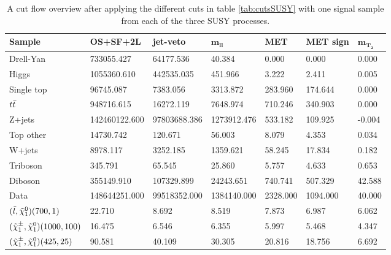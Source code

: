 \begin{landscape}
\begin{table}[H]
    \centering
    \begin{tabular}{l l l l l l l}
    \toprule
    \textbf{Sample} & \textbf{OS+SF+2L} & \textbf{jet-veto} & $\mathbf{m_{ll}}$ & \textbf{MET} & \textbf{MET sign} & $\mathbf{m_{T_2}}$\\
    \midrule
    \midrule
        Drell-Yan & 733055.427 & 64177.536 & 40.384 & 0.000 & 0.000  & 0.000 \\
        Higgs & 1055360.610 & 442535.035 & 451.966 & 3.222 & 2.411 & 0.005\\
        Single top & 96745.087 & 7383.056 & 3313.872 & 283.960 & 174.644 & 0.000\\
        $t\Bar{t}$ & 948716.615 & 16272.119 & 7648.974 & 710.246 & 340.903 & 0.000\\
        Z+jets & 142460122.600 & 97803688.386 & 1273912.476 & 533.182 & 109.925 & -0.004\\
        Top other & 14730.742 & 120.671 & 56.003 & 8.079 & 4.353 & 0.034\\
        W+jets & 8978.117 & 3252.185 & 1359.621 & 58.245 & 17.834 & 0.182\\
        Triboson & 345.791 & 65.545 & 25.860 & 5.757 & 4.633 & 0.653\\
        Diboson & 355149.910 & 107329.899 & 24243.651 & 740.741 & 507.329 & 42.588\\
        Data & 148644251.000 & 99518352.000 & 1384140.000 & 2328.000 & 1094.000 & 40.000\\
        $(\Tilde{l}, \Tilde{\chi}_1^0) (700,1)$ & 22.710 & 8.692 & 8.519 & 7.873 & 6.987 & 6.062\\
        $(\Tilde{\chi}_1^\pm, \Tilde{\chi}_1^0) (1000, 100)$ & 16.475 & 6.546 & 6.355 & 5.997 & 5.468 & 4.347\\
        $(\Tilde{\chi}_1^\pm, \Tilde{\chi}_1^0) (425,25)$ & 90.581 & 40.109 & 30.305 & 20.816 & 18.756 & 6.692\\
    \bottomrule
    \end{tabular}
    \caption{A cut flow overview after applying the different cuts in table \ref{tab:cutsSUSY} with one signal sample from each of the three SUSY processes.}
    \label{tab:cutflowSUSY}
\end{table}
\end{landscape}




